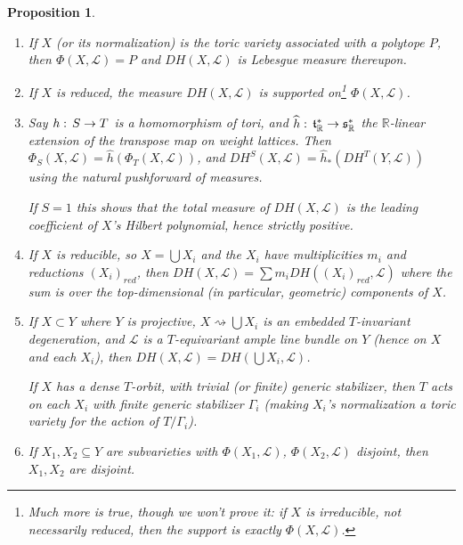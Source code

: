 \documentclass[11pt]{amsart}
\newtheorem{proposition}[Thm]{Proposition}
\theoremstyle{definition}
\newcommand{\RR}{\mathbb{R}}
\newcommand\wh\widehat
\newcommand\Union\bigcup
\newcommand\lie[1]{{\mathfrak #1}}
\newcommand\calL{{\mathcal L}}
\newcommand\junk[1]{}
\renewcommand{\colon}{\mathrel{:}}
\renewcommand{\colon}{:\mkern\thinmuskip}
\begin{document}
\begin{proposition}\label{prop:DH}
  \begin{enumerate}
  \item If $X$ (or its normalization) is the toric variety associated
    with a polytope $P$, then $\Phi(X,\calL) = P$ and $DH(X,\calL)$ is
    Lebesgue measure thereupon.  \junk{ \item If $X$ is irreducible,
      then the support of $DH(X,\calL)$ is the moment polytope $\Phi(X,\calL)$.}
  \item If $X$ is reduced, the measure $DH(X,\calL)$ is supported
    on\footnote{Much more is true, though we won't prove it:
    	if $X$ is irreducible, not necessarily reduced, then the support
    	is {\em exactly} $\Phi(X,\calL)$.} $\Phi(X,\calL)$. 
  \item Say $h\colon S \to T$ is a homomorphism of tori,
    and $\wh h\colon\lie t^*_\RR \to \lie s^*_\RR$ the $\RR$-linear
    extension of the transpose map on weight lattices. 
    Then $\Phi_S(X,\calL) = \wh h(\Phi_T(X,\calL))$, and
    $DH^S(X,\calL) = \wh h_*(DH^T(Y,\calL))$ using the natural
    pushforward of measures.

    If $S=1$ this shows that the total measure of $DH(X,\calL)$ is the
    leading coefficient of $X$'s Hilbert polynomial, hence strictly positive.
    \junk{
    \item If $X$ is irreducible, and $T$ acts with generic stabilizer $S$,
      then $\dim_\RR \Phi(X,\calL) = \dim(T/S)$. More specifically,
      $\Phi(X,\calL)$ is contained in a translate of $S^\perp$ (as in
      Proposition \ref{prop:spanOfPhi}).
    \item If $T$ acts on $Y$ with a dense orbit, and the generic stabilizer has
      $k$ components, then $DH(Y,\calL)$ is $\frac 1 k$ times Lebesgue measure
      on the moment polytope $\Phi(Y,\calL)$ (even if it is not of full dimension).
    }
  \item If $X$ is reducible, so $X = \Union X_i$ and the $X_i$ have
    multiplicities $m_i$ and reductions $(X_i)_{red}$, then
    $DH(X,\calL) = \sum m_i DH((X_i)_{red},\calL)$ where the sum is over the
    top-dimensional (in particular, geometric) components of $X$.
  \item If $X \subset Y$ where $Y$ is projective, $X \rightsquigarrow \Union X_i$ is an embedded
    $T$-invariant degeneration, and $\calL$ is a
    $T$-equivariant ample line bundle on $Y$ (hence on $X$ and each
    $X_i$), then $DH(X,\calL) = DH(\Union X_i,\calL)$.

    If $X$ has a dense $T$-orbit, with trivial (or finite)
    generic stabilizer, then $T$ acts on each $X_i$ with finite
    generic stabilizer $\Gamma_i$ (making $X_i$'s normalization
    a toric variety for the action of $T/\Gamma_i$).
  \item If $X_1,X_2 \subseteq Y$ are subvarieties with
    $\Phi(X_1,\calL)$, $\Phi(X_2,\calL)$ disjoint, then $X_1,X_2$ are disjoint.
  \end{enumerate}
\end{proposition}
\end{document}

